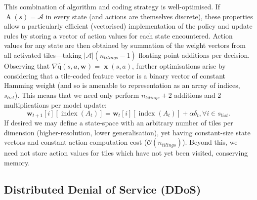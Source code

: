 \documentclass[conference, letterpaper, 10pt, times]{IEEEtran}
\newcommand{\acval}[3]{\ensuremath{\operatorname{\hat{q}}(#1, #2, #3)}}
\newcommand{\wvec}[1]{\ensuremath{\bm{w}_{#1}}}
\begin{document}
This combination of algorithm and coding strategy is well-optimised.
If $\operatorname{A}(s) = \mathcal{A}$ in every state (and actions are themselves discrete), these properties allow a particularly efficient (vectorised) implementation of the policy and update rules by storing a vector of action values for each state encountered.
Action values for any state are then obtained by summation of the weight vectors from all activated tiles---taking $|\mathcal{A}|(n_{\mathit{tilings}}-1)$ floating point additions per decision.
Observing that $\nabla{\acval{s}{a}{\wvec{}}} = \operatorname{\mathbf{x}}(s, a)$, further optimisations arise by considering that a tile-coded feature vector is a binary vector of constant Hamming weight (and so is amenable to representation as an array of indices, $s_{\mathit{list}}$).
This means that we need only perform $n_{\mathit{tilings}} + 2$ additions and \num{2} multiplications per model update:
\begin{equation}
	\bm{w}_{t+1}[i][\operatorname{index}(A_t)] = \bm{w}_{t}[i][\operatorname{index}(A_t)] + \alpha \delta_t, \forall i \in s_{\mathit{list}}.
	\label{eqn:sg-sarsa-opt}
\end{equation}
If desired we may define a state-space with an arbitrary number of tiles per dimension (higher-resolution, lower generalisation), yet having constant-size state vectors and constant action computation cost ($\mathcal{O}(n_{\mathit{tilings}})$).
Beyond this, we need not store action values for tiles which have not yet been visited, conserving memory.



\subsection{Distributed Denial of Service (DDoS)}
\end{document}
